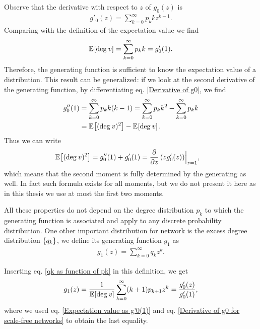 \documentclass[
11pt, %
english, %
singlespacing, %
nolistspacing, %
liststotoc, %
headsepline, %
]{MastersDoctoralThesis} %
\begin{document}
Observe that the derivative with respect to $z$ of $g_0(z)$ is
\begin{align}
	g'_0(z) = \sum_{k=0}^\infty p_k k z^{k-1}. \label{Derivative of g0}
\end{align}
Comparing with the definition of the expectation value we find
\begin{align}
	\mathbb{E}_{}\!\left[ \mathrm{deg}_{}\, v \right] = \sum_{k=0}^\infty p_k k = g'_0(1). \label{Expectation value as g'0(1)}
\end{align}
Therefore, the generating function is sufficient to know the expectation value of a distribution. This result can be generalized: if we look at the second derivative of the generating function, by differentiating eq. \eqref{Derivative of g0}, we find
\begin{align}
	g''_0(1) &= \sum_{k=0}^\infty p_k k (k - 1) = \sum_{k=0}^\infty p_k k^2 - \sum_{k=0}^\infty p_k k \\
		&= \mathbb{E}_{}\!\left[ (\mathrm{deg}_{}\, v)^2 \right] - \mathbb{E}_{}\!\left[ \mathrm{deg}_{}\, v \right]. \label{Second derivative of g0}
\end{align}
Thus we can write
\begin{align}
	\mathbb{E}_{}\!\left[ (\mathrm{deg}_{}\, v)^2 \right] &= g''_0(1) + g'_0(1) = \frac{\partial}{\partial z}\left(z g'_0(z)\right)\Bigr|_{z = 1},  \label{Second moment as derivatives of g0}
\end{align}
which means that the second moment is fully determined by the generating as well. In fact such formula exists for all moments, but we do not present it here as in this thesis we use at most the first two moments.

All these properties do not depend on the degree distribution $p_k$ to which the generating function is associated and apply to any discrete probability distribution. One other important distribution for network is the excess degree distribution $\{q_k\}$, we define its generating function $g_1$ as
\begin{align}
	g_1(z) = \sum_{k=0}^\infty q_k z^k. \label{Definition of g1}
\end{align}

Inserting eq. \eqref{qk as function of pk} in this definition, we get
\begin{align}
	g_1(z) = \frac{1}{\mathbb{E}_{}\!\left[ \mathrm{deg}_{}\, v \right]} \sum_{k=0}^\infty (k + 1) p_{k + 1} z^k = \frac{g'_0(z)}{g'_0(1)}, \label{g1 as a function of g0}
\end{align}
where we used eq. \eqref{Expectation value as g'0(1)} and eq. \eqref{Derivative of g0 for scale-free networks}  to obtain the last equality.
\end{document}
